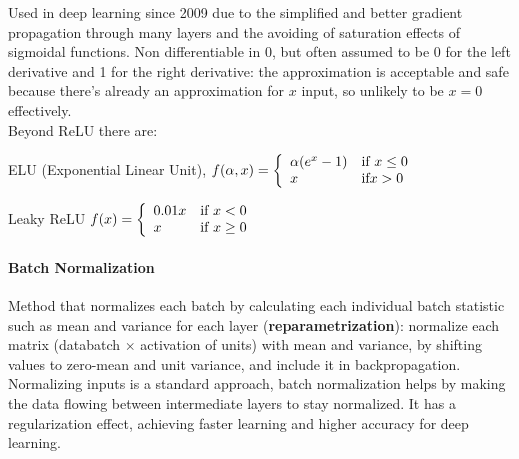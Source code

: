 \documentclass[10pt]{report}
\begin{document}
Used in deep learning since 2009 due to the simplified and better gradient propagation through many layers and the avoiding of saturation effects of sigmoidal functions. Non differentiable in 0, but often assumed to be 0 for the left derivative and 1 for the right derivative: the approximation is acceptable and safe because there's already an approximation for $x$ input, so unlikely to be $x=0$ effectively.\\
Beyond ReLU there are:
\begin{list}{}{}
	\item ELU (Exponential Linear Unit), $f(\alpha,x)=\left\{\begin{array}{l l}
	\alpha(e^x - 1)&\text{if }x \leq 0\\
	x&\text{if} x > 0
	\end{array}\right.$
	\item Leaky ReLU $f(x) = \left\{\begin{array}{l l}
	0.01x&\text{if }x < 0\\
	x&\text{if }x \geq 0 
	\end{array}\right.$
\end{list}
\paragraph{Batch Normalization} Method that normalizes each batch by calculating each individual batch statistic such as mean and variance for each layer (\textbf{reparametrization}): normalize each matrix (databatch $\times$ activation of units) with mean and variance, by shifting values to zero-mean and unit variance, and include it in backpropagation.\\
Normalizing inputs is a standard approach, batch normalization helps by making the data flowing between intermediate layers to stay normalized. It has a regularization effect, achieving faster learning and higher accuracy for deep learning.
\end{document}
